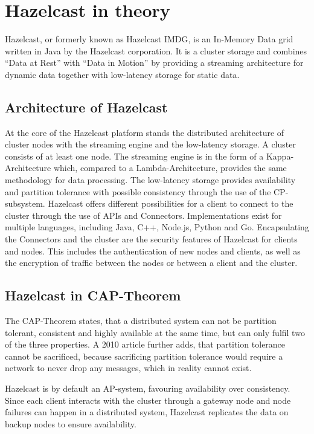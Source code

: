 
\section{Hazelcast in theory}
Hazelcast, or formerly known as Hazelcast IMDG, is an In-Memory Data grid
written in Java by the Hazelcast corporation. It is a cluster storage and
combines \enquote{Data at Rest} with \enquote{Data in Motion} by providing a streaming
architecture for dynamic data together with low-latency storage for static
data. \parencite{HZintro, hazelcast_what_2022}

\subsection{Architecture of Hazelcast}
At the core of the Hazelcast platform stands the distributed architecture of
cluster nodes with the streaming engine and the low-latency storage. A cluster
consists of at least one node. The streaming engine is in the form of a
Kappa-Architecture which, compared to a Lambda-Architecture, provides the same
methodology for data processing. The low-latency storage provides availability
and partition tolerance with possible consistency through the use of the
CP-subsystem. Hazelcast offers different possibilities for a client to connect
to the cluster through the use of APIs and Connectors. Implementations exist for
multiple languages, including Java, C++, Node.js, Python and
Go. \parencite{hazelcast_what_2022, HZclient} Encapsulating the
Connectors and the cluster are the security features of Hazelcast for clients
and nodes. This includes the authentication of new nodes and clients, as well as
the encryption of traffic between the nodes or between a client and the cluster.

\subsection{Hazelcast in CAP-Theorem}
The CAP-Theorem states, that a distributed system can not be partition tolerant,
consistent and highly available at the same time, but can only fulfil two of
the three properties. A 2010 article further adds, that partition tolerance
cannot be sacrificed, because sacrificing partition tolerance would require a
network to never drop any messages, which in reality cannot
exist. \parencite{Brewer2000, CodahalePart}

Hazelcast is by default an AP-system, favouring availability over consistency.
Since each client interacts with the cluster through a gateway node and node
failures can happen in a distributed system, Hazelcast replicates the data on
backup nodes to ensure availability. \parencite{HZcap, HZcap2}


